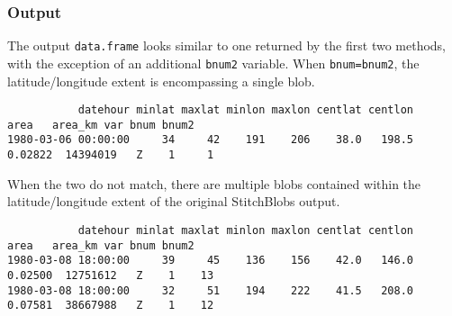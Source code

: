 \documentclass{article}
\begin{document}
%
%
%

\subsubsection{Output}

The output \texttt{data.frame} looks similar to one returned by the first two methods, with the exception of an additional \texttt{bnum2} variable. When \texttt{bnum=bnum2}, the latitude/longitude extent is encompassing a single blob.

\begin{verbatim}
           datehour minlat maxlat minlon maxlon centlat centlon    area   area_km var bnum bnum2
1980-03-06 00:00:00     34     42    191    206    38.0   198.5 0.02822  14394019   Z    1     1
\end{verbatim}

When the two do not match, there are multiple blobs contained within the latitude/longitude extent of the original StitchBlobs output.

\begin{verbatim}
           datehour minlat maxlat minlon maxlon centlat centlon    area   area_km var bnum bnum2
1980-03-08 18:00:00     39     45    136    156    42.0   146.0 0.02500  12751612   Z    1    13
1980-03-08 18:00:00     32     51    194    222    41.5   208.0 0.07581  38667988   Z    1    12
\end{verbatim}
\end{document}

